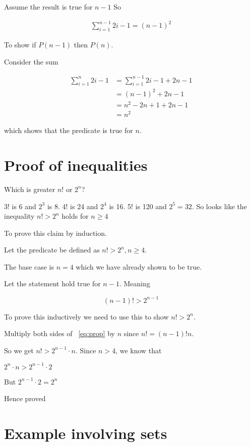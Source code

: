 \documentclass[12pt]{article}
\begin{document}
Assume the result is true for $n-1$ So 

\begin{align*}
\sum_{i=1}^{n-1} 2i - 1 = (n-1)^2
\end{align*}

To show if $P(n-1)$ then $P(n)$.

Consider the sum 

\begin{align*}
\sum_{i=1}^n 2i - 1 &= \sum_{i=1}^{n-1} 2i - 1 + 2n - 1 \\
&= (n-1)^2 + 2n - 1 \tag{using P(n-1) true}\\
&= n^2 - 2n + 1 + 2n - 1 \\
&= n^2
\end{align*}

which shows that the predicate is true for $n$.

\section*{Proof of inequalities}

Which is greater $n!$ or $2^n$? 

3! is 6 and $2^3$ is 8. 4! is 24 and $2^4$ is 16. 5! is 120 and $2^5=32$. So looks like the inequality $n! > 2^n$ holds for $n \ge 4$

To prove this claim by induction.

Let the predicate be defined as $n! > 2^n, n \ge 4$.

The base case is $n = 4$ which we have already shown to be true.

Let the statement hold true for $n-1$. Meaning 

\begin{equation} \label{eq:prop}
(n-1)! > 2^{n-1}
\end{equation}

To prove this inductively we need to use this to show $n! > 2^n$.

Multiply both sides of ~\ref{eq:prop} by $n$ since $n! = (n-1)!n$.

So we get $n! > 2^{n-1} \cdot n$. Since $n >4$, we know that 

$2^n \cdot n > 2^{n-1} \cdot 2$ 

But $2^{n-1} \cdot 2 = 2^n$

Hence proved

\section*{Example involving sets}
\end{document}
